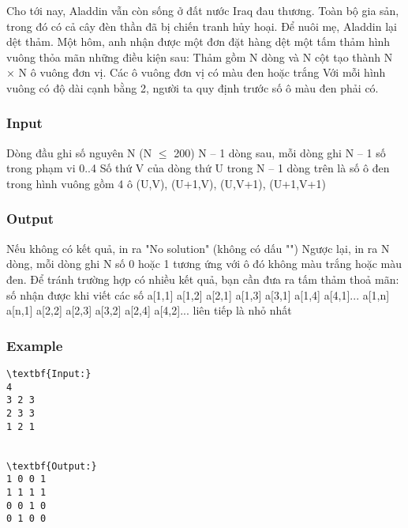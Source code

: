 



   Cho tới nay, Aladdin vẫn còn sống ở đất nước Iraq đau thương. Toàn bộ gia sản, trong đó có cả cây đèn thần đã bị chiến tranh hủy hoại. Để nuôi mẹ, Aladdin lại dệt thảm. Một hôm, anh nhận được một đơn đặt hàng dệt một tấm thảm hình vuông thỏa mãn những điều kiện sau:  Thảm gồm N dòng và N cột tạo thành N × N ô vuông đơn vị. Các ô vuông đơn vị có màu đen hoặc trắng  Với mỗi hình vuông có độ dài cạnh bằng 2, người ta quy định trước số ô màu đen phải có.  

\subsubsection{   Input  }

   Dòng đầu ghi số nguyên N (N $\le$ 200)  N – 1 dòng sau, mỗi dòng ghi N – 1 số trong phạm vi 0..4  Số thứ V của dòng thứ U trong N – 1 dòng trên là số ô đen trong hình vuông gồm 4 ô (U,V), (U+1,V), (U,V+1), (U+1,V+1)  

\subsubsection{   Output  }

   Nếu không có kết quả, in ra "No solution" (không có dấu "") Ngược lại, in ra N dòng, mỗi dòng ghi N số 0 hoặc 1 tương ứng với ô đó không màu trắng hoặc màu đen. Để tránh trường hợp có nhiều kết quả, bạn cần đưa ra tấm thảm thoả mãn: số nhận được khi viết các số a[1,1] a[1,2] a[2,1] a[1,3] a[3,1] a[1,4] a[4,1]... a[1,n] a[n,1] a[2,2] a[2,3] a[3,2] a[2,4] a[4,2]... liên tiếp là nhỏ nhất  

\subsubsection{   Example  }
\begin{verbatim}
\textbf{Input:}
4
3 2 3
2 3 3
1 2 1


\textbf{Output:}
1 0 0 1
1 1 1 1
0 0 1 0
0 1 0 0
\end{verbatim}
